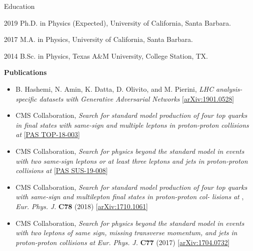 \begin{vitae}

\begin{vitaesection}{Education}
\vspace{-0.1cm}
\item [2019] Ph.D. in Physics (Expected), University of California, Santa Barbara.
\item [2017] M.A. in Physics, University of California, Santa Barbara.
\item [2014] B.Sc. in Physics, Texas A\&M University, College Station, TX.
\end{vitaesection}

\textbf{Publications}



    \begin{itemize}
        \item B. Hashemi, N. Amin, K. Datta, D. Olivito, and M. Pierini, \textit{LHC analysis-specific datasets with Generative Adversarial Networks} [\href{https://arxiv.org/abs/1901.05282}{arXiv:1901.0528}]
        \item CMS Collaboration, \textit{Search for standard model production of four top quarks in final states with same-sign and multiple leptons in proton-proton collisions at \sthirteen} 
            [\href{http://inspirehep.net/record/1726177}{PAS TOP-18-003}]
        \item CMS Collaboration, \textit{Search for physics beyond the standard model in events with two same-sign leptons or at least three leptons and jets in proton-proton collisions at \sthirteen} 
            [\href{http://inspirehep.net/record/1726691}{PAS SUS-19-008}]
        \item CMS Collaboration, \textit{Search for standard model production of four top quarks with same-sign and multilepton final states in proton-proton col- lisions at \sthirteen},
            \textit{Eur. Phys. J.} \textbf{C78} (2018) 
            [\href{https://arxiv.org/abs/1710.1061}{arXiv:1710.1061}]
        \item CMS Collaboration, \textit{Search for physics beyond the standard model in events with two leptons of same sign, missing transverse momentum, and jets in proton-proton collisions at \sthirteen}
            \textit{Eur. Phys. J.} \textbf{C77} (2017) 
            [\href{https://arxiv.org/abs/1704.0732}{arXiv:1704.0732}]
    \end{itemize}

\end{vitae}

